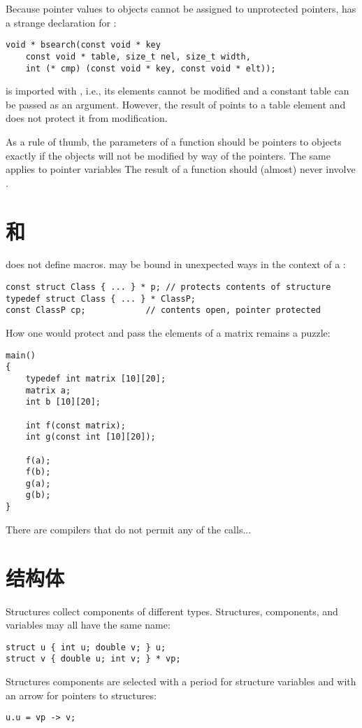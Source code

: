 Because pointer values to  objects cannot be assigned to
unprotected pointers,  has a strange declaration for
:
\begin{lstlisting}
void * bsearch(const void * key
	const void * table, size_t nel, size_t width,
	int (* cmp) (const void * key, const void * elt));
\end{lstlisting}
 is imported with , i.e., its elements cannot be
modified and a constant table can be passed as an argument. However, the
result of  points to a table element and does not protect it
from modification.

As a rule of thumb, the parameters of a function should be pointers to
 objects exactly if the objects will not be modified by way of
the pointers. The same applies to pointer variables The result of a function
should (almost) never involve .

\section{ 和 }
 does not define macros.  may be bound in
unexpected ways in the context of a :
\begin{lstlisting}
const struct Class { ... } * p;	// protects contents of structure
typedef struct Class { ... } * ClassP;
const ClassP cp;			// contents open, pointer protected
\end{lstlisting}
How one would protect and pass the elements of a matrix remains a puzzle:
\begin{lstlisting}
main()
{
	typedef int matrix [10][20];
	matrix a;
	int b [10][20];

	int f(const matrix);
	int g(const int [10][20]);

	f(a);
	f(b);
	g(a);
	g(b);
}
\end{lstlisting}
There are compilers that do not permit any of the calls...

\section{结构体}
Structures collect components of different types. Structures, components,
and variables may all have the same name:
\begin{lstlisting}
struct u { int u; double v; } u;
struct v { double u; int v; } * vp;
\end{lstlisting}
Structures components are selected with a period for structure variables and
with an arrow for pointers to structures:
\begin{lstlisting}
u.u = vp -> v;
\end{lstlisting}

